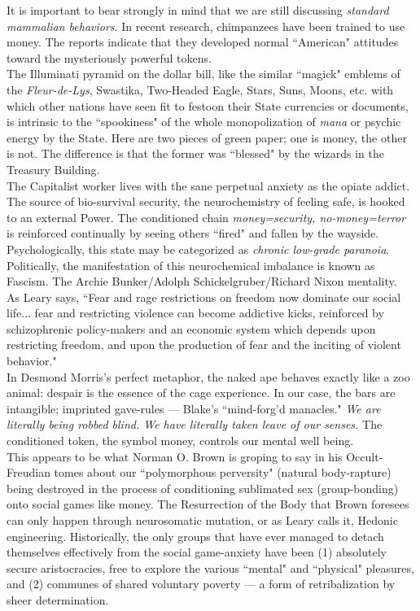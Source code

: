 It is important to bear strongly in mind that we are still discussing \emph{standard mammalian behaviors}. In recent research, chimpanzees have been trained to use money. The reports indicate that they developed normal ``American" attitudes toward the mysteriously powerful tokens.\\
The Illuminati pyramid on the dollar bill, like the similar ``magick" emblems of the \emph{Fleur-de-Lys}, Swastika, Two-Headed Eagle, Stars, Suns, Moons, etc. with which other nations have seen fit to festoon their State currencies or documents, is intrinsic to the ``spookiness" of the whole monopolization of \emph{mana} or psychic energy by the State. Here are two pieces of green paper; one is money, the other is not. The difference is that the former was ``blessed" by the wizards in the Treasury Building.\\
The Capitalist worker lives with the sane perpetual anxiety as the opiate addict. The source of bio-survival security, the neurochemistry of feeling safe, is hooked to an external Power. The conditioned chain \emph{money=security, no-money=terror} is reinforced continually by seeing others ``fired" and fallen by the wayside. Psychologically, this state may be categorized as \emph{chronic low-grade paranoia}. Politically, the manifestation of this neurochemical imbalance is known as Fascism. The Archie Bunker/Adolph Schickelgruber/Richard Nixon mentality.\\
As Leary says, ``Fear and rage restrictions on freedom now dominate our social life... fear and restricting violence can become addictive kicks, reinforced by schizophrenic policy-makers and an economic system which depends upon restricting freedom, and upon the production of fear and the inciting of violent behavior."\\
In Desmond Morris's perfect metaphor, the naked ape behaves exactly like a zoo animal: despair is the essence of the cage experience. In our case, the bars are intangible; imprinted gave-rules --- Blake's ``mind-forg'd manacles." \emph{We are literally being robbed blind. We have literally taken leave of our senses.} The conditioned token, the symbol money, controls our mental well being.\\
This appears to be what Norman O. Brown is groping to say in his Occult-Freudian tomes about our ``polymorphous perversity" (natural body-rapture) being destroyed in the process of conditioning sublimated sex (group-bonding) onto social games like money. The Resurrection of the Body that Brown foresees can only happen through neurosomatic mutation, or as Leary calls it, Hedonic engineering. Historically, the only groups that have ever managed to detach themselves effectively from the social game-anxiety have been (1) absolutely secure aristocracies, free to explore the various ``mental" and ``physical" pleasures, and (2) communes of shared voluntary poverty --- a form of retribalization by sheer determination.\\
